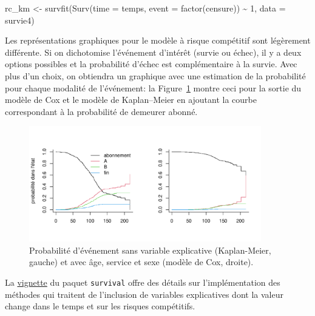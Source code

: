 \documentclass[
  11pt,
  letterpaper,
]{scrbook}
\newenvironment{Shaded}{\begin{snugshade}}{\end{snugshade}}
\newcommand{\AttributeTok}[1]{\textcolor[rgb]{0.40,0.45,0.13}{#1}}
\newcommand{\DecValTok}[1]{\textcolor[rgb]{0.68,0.00,0.00}{#1}}
\newcommand{\FunctionTok}[1]{\textcolor[rgb]{0.28,0.35,0.67}{#1}}
\newcommand{\NormalTok}[1]{\textcolor[rgb]{0.00,0.23,0.31}{#1}}
\newcommand{\OtherTok}[1]{\textcolor[rgb]{0.00,0.23,0.31}{#1}}
\newcommand{\SpecialCharTok}[1]{\textcolor[rgb]{0.37,0.37,0.37}{#1}}
\theoremstyle{definition}
\theoremstyle{remark}
\begin{document}
\begin{Shaded}
\begin{Highlighting}[]
\NormalTok{rc\_km }\OtherTok{\textless{}{-}} \FunctionTok{survfit}\NormalTok{(}\FunctionTok{Surv}\NormalTok{(}\AttributeTok{time =}\NormalTok{ temps, }
             \AttributeTok{event =} \FunctionTok{factor}\NormalTok{(censure)) }\SpecialCharTok{\textasciitilde{}} \DecValTok{1}\NormalTok{,}
             \AttributeTok{data =}\NormalTok{ survie4)}
\end{Highlighting}
\end{Shaded}

Les représentations graphiques pour le modèle à risque compétitif sont
légèrement différente. Si on dichotomise l'événement d'intérêt (survie
ou échec), il y a deux options possibles et la probabilité d'échec est
complémentaire à la survie. Avec plus d'un choix, on obtiendra un
graphique avec une estimation de la probabilité pour chaque modalité de
l'événement: la Figure~\ref{fig-competitif} montre ceci pour la sortie
du modèle de Cox et le modèle de Kaplan--Meier en ajoutant la courbe
correspondant à la probabilité de demeurer abonné.

\begin{figure}[ht!]

{\centering \includegraphics[width=0.9\textwidth,height=\textheight]{survie_files/figure-pdf/fig-competitif-1.pdf}

}

\caption{\label{fig-competitif}Probabilité d'événement sans variable
explicative (Kaplan-Meier, gauche) et avec âge, service et sexe (modèle
de Cox, droite).}

\end{figure}

La
\href{https://cran.r-project.org/web/packages/survival/vignettes/timedep.pdf}{vignette}
du paquet \texttt{survival} offre des détails sur l'implémentation des
méthodes qui traitent de l'inclusion de variables explicatives dont la
valeur change dans le temps et sur les risques compétitifs.
\end{document}
